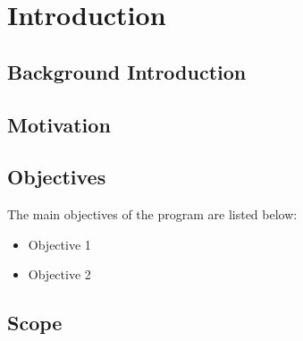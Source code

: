 \documentclass[a4paper, 12pt]{report}
\title{\projectTitle}
\author{Niyoj Oli}
\date{\projectDate}
\begin{document}





\onehalfspacicng    %
\pagestyle{plain} %







\tableofcontents
\newpage

\listoffigures
\newpage

\listoftables
\newpage

\printglossary[type=acronym,style=acronyms]
\newpage

\pagestyle{fancy}    %

\chapter{Introduction}
\lipsum[10]

\section{Background Introduction}
\lipsum[15]

\section{Motivation}
\lipsum[5]

\lipsum[10]\cite{einstein}

\section{Objectives}
The main objectives of the program are listed below:
\begin{itemize}
    \item Objective 1
    \item Objective 2
\end{itemize}

\section{Scope}
\lipsum[5]
\end{document}
